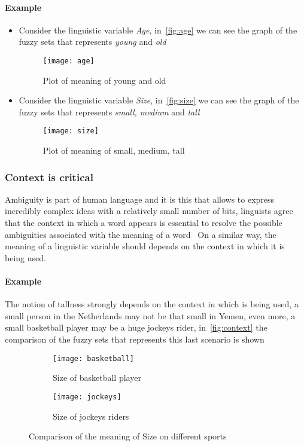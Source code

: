 \documentclass[]{article}
\begin{document}
\paragraph{Example}
\begin{itemize}
  \item Consider the linguistic variable \textit{Age}, in~\autoref{fig:age} we can
    see the graph of the fuzzy sets that represents \textit{young} and
    \textit{old}
    \begin{figure}[ht!]
      \centering
      \texttt{[image: age]}
      \caption{Plot of meaning of young and old\label{fig:age}}
    \end{figure}
  \item Consider the linguistic variable \textit{Size}, in~\autoref{fig:size} we can
    see the graph of the fuzzy sets that represents \textit{small, medium} and
    \textit{tall}
    \begin{figure}[ht!]
      \centering
      \texttt{[image: size]}
      \caption{Plot of meaning of small, medium, tall\label{fig:size}}
    \end{figure}
\end{itemize}

\subsubsection*{Context is critical}
Ambiguity is part of human language and it is this that allows to express
incredibly complex ideas with a relatively small number of bits, linguists
agree that the context in which a word appears is essential to resolve the
possible ambiguities associated with the meaning of a word~\citep{Bransford1972}
On a similar way, the meaning of a linguistic variable should depends on the
context in which it is being used.
\paragraph{Example}
The notion of tallness strongly depends on the context in which is being used, a
small person in the Netherlands may not be that small in Yemen, even more, a
small basketball player may be a huge jockeys rider, in~\autoref{fig:context} the
comparison of the fuzzy sets that represents this last scenario is shown

\begin{figure}[ht!]
\centering
\begin{subfigure}{.5\textwidth}
  \centering
  \texttt{[image: basketball]}
  \caption{Size of basketball player}
\end{subfigure}%
\begin{subfigure}{.5\textwidth}
  \centering
  \texttt{[image: jockeys]}
  \caption{Size of jockeys riders}
\end{subfigure}
\caption{Comparison of the meaning of Size on different sports\label{fig:context}}
\end{figure}
\end{document}
